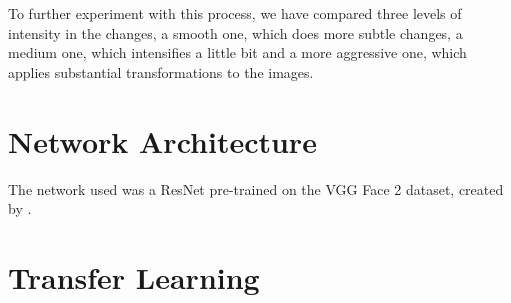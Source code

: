 To further experiment with this process, we have compared three levels of intensity in the changes, a smooth one, which does more subtle changes, a medium one, which intensifies a little bit and a more aggressive one, which applies substantial transformations to the images.

\section{Network Architecture}

The network used was a ResNet pre-trained on the VGG Face 2 dataset, created by \cite{ParkhiVZ15}.

\section{Transfer Learning}




